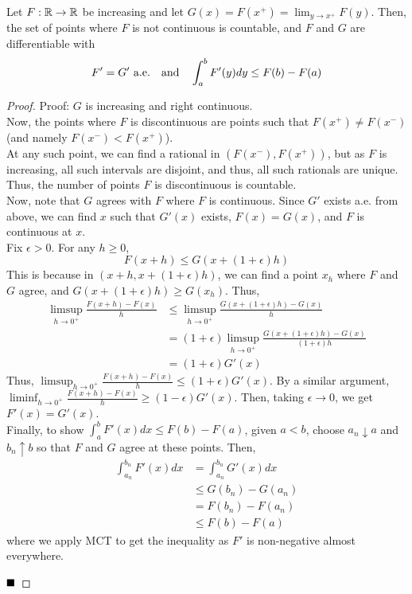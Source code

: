 \begin{lemma}
    Let $F : \mathbb{R} \to \mathbb{R}$ be increasing and let $G(x) = F(x^{+}) = \lim_{y \to x^{+}} F(y)$. Then, the set of points where $F$ is not continuous is countable, and $F$ and $G$ are differentiable with
    \[ F' = G' \text{ a.e.} \quad \text{and} \quad \int_{a}^{b} F'(y) dy \leq F(b) - F(a) \]
\end{lemma}
\begin{proof}{Proof:}
    $G$ is increasing and right continuous.\\

    Now, the points where $F$ is discontinuous are points such that $F(x^{+}) \neq F(x^{-})$ (and namely $F(x^{-}) < F(x^{+})$).\\

    At any such point, we can find a rational in $(F(x^{-}), F(x^{+}))$, but as $F$ is increasing, all such intervals are disjoint, and thus, all such rationals are unique. Thus, the number of points $F$ is discontinuous is countable.\\

    Now, note that $G$ agrees with $F$ where $F$ is continuous. Since $G'$ exists a.e. from above, we can find $x$ such that $G'(x)$ exists, $F(x) = G(x)$, and $F$ is continuous at $x$.\\

    Fix $\epsilon > 0$. For any $h \geq 0$,
    \[ F(x + h) \leq G(x + (1 + \epsilon)h) \]
    This is because in $(x + h, x + (1 + \epsilon)h)$, we can find a point $x_h$ where $F$ and $G$ agree, and $G(x + (1 + \epsilon)h) \geq G(x_h)$. Thus,
    \begin{align*}
        \limsup_{h \to 0^{+}} \frac{F(x + h) - F(x)}{h} &\leq \limsup_{h \to 0^{+}} \frac{G(x + (1 + \epsilon)h) - G(x)}{h}\\
        &= (1 + \epsilon)\limsup_{h \to 0^{+}} \frac{G(x + (1 + \epsilon)h) - G(x)}{(1 + \epsilon)h}\\
        &= (1 + \epsilon)G'(x)
    \end{align*}
    Thus, $\limsup_{h \to 0^{+}} \frac{F(x + h) - F(x)}{h} \leq (1 + \epsilon)G'(x)$. By a similar argument, $\liminf_{h \to 0^{+}} \frac{F(x + h) - F(x)}{h} \geq (1 - \epsilon)G'(x)$. Then, taking $\epsilon \to 0$, we get $F'(x) = G'(x)$.\\

    Finally, to show $\int_{a}^{b} F'(x) dx \leq F(b) - F(a)$, given $a < b$, choose $a_n \downarrow a$ and $b_n \uparrow b$ so that $F$ and $G$ agree at these points. Then,
    \begin{align*}
        \int_{a_n}^{b_n} F'(x) dx &= \int_{a_n}^{b_n} G'(x) dx\\
        &\leq G(b_n) - G(a_n)\\
        &= F(b_n) - F(a_n)\\
        &\leq F(b) - F(a)
    \end{align*}
    where we apply MCT to get the inequality as $F'$ is non-negative almost everywhere. 

    $\qed$
\end{proof}

